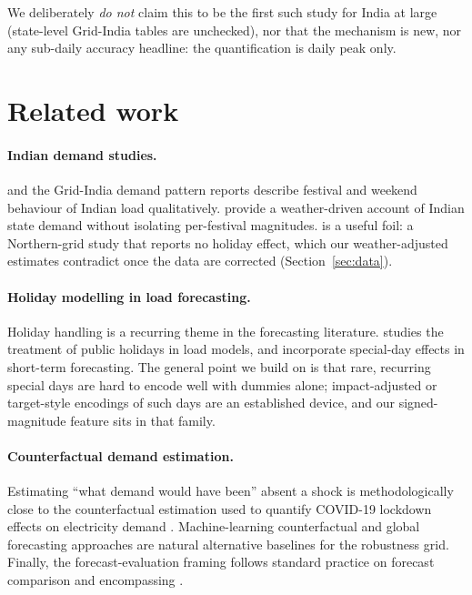 \documentclass[11pt]{article}
\begin{document}
We deliberately \emph{do not} claim this to be the first such study for India at
large (state-level Grid-India tables are unchecked), nor that the mechanism is
new, nor any sub-daily accuracy headline: the quantification is daily peak only.

\section{Related work}
\label{sec:related}

\paragraph{Indian demand studies.} \citet{gaur2016} and the Grid-India demand
pattern reports \citep{gridindia2023} describe festival and weekend behaviour of
Indian load qualitatively. \citet{hunt2025} provide a weather-driven account of
Indian state demand without isolating per-festival magnitudes. \citet{banerjee2010}
is a useful foil: a Northern-grid study that reports no holiday effect, which our
weather-adjusted estimates contradict once the data are corrected
(Section~\ref{sec:data}).

\paragraph{Holiday modelling in load forecasting.} Holiday handling is a recurring
theme in the forecasting literature. \citet{ziel2018} studies the treatment of
public holidays in load models, and \citet{arora2018} incorporate special-day
effects in short-term forecasting. The general point we build on is that rare,
recurring special days are hard to encode well with dummies alone; impact-adjusted
or target-style encodings of such days are an established device, and our
signed-magnitude feature sits in that family.

\paragraph{Counterfactual demand estimation.} Estimating ``what demand would have
been'' absent a shock is methodologically close to the counterfactual estimation
used to quantify COVID-19 lockdown effects on electricity demand
\citep{fezzi2020,bahmanyar2020}. Machine-learning counterfactual and global
forecasting approaches \citep{prasanna2022,rubattu2023} are natural alternative
baselines for the robustness grid. Finally, the forecast-evaluation framing
follows standard practice on forecast comparison and encompassing
\citep{clements1996}.
\end{document}
